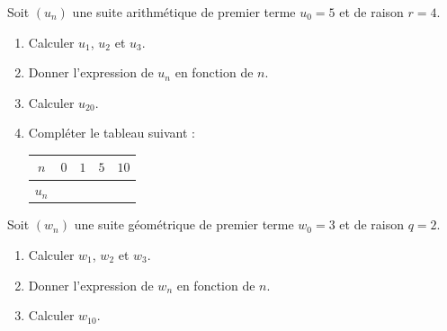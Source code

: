 \documentclass[11pt]{article}
\begin{document}
\begin{exercice}
Soit $(u_n)$ une suite arithmétique de premier terme $u_0 = 5$ et de raison $r = 4$.
\begin{enumerate}
\item Calculer $u_1$, $u_2$ et $u_3$.
\item Donner l'expression de $u_n$ en fonction de $n$.
\item Calculer $u_{20}$.
\item Compléter le tableau suivant :

\begin{center}
\begin{tabular}{|c|c|c|c|c|}
\hline
$n$ & $0$ & $1$ & $5$ & $10$ \\
\hline
$u_n$ & & & & \\
\hline
\end{tabular}
\end{center}
\end{enumerate}
\end{exercice}

\begin{exercice}
Soit $(w_n)$ une suite géométrique de premier terme $w_0 = 3$ et de raison $q = 2$.
\begin{enumerate}
\item Calculer $w_1$, $w_2$ et $w_3$.
\item Donner l'expression de $w_n$ en fonction de $n$.
\item Calculer $w_{10}$.
\end{enumerate}
\end{exercice}
\end{document}

